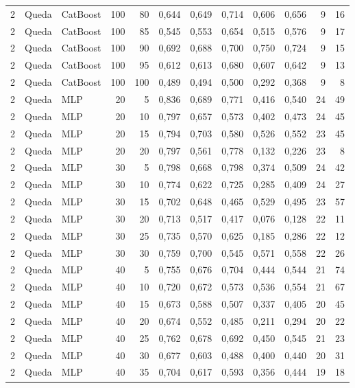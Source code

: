 \begin{longtable}{@{}rllrrrrrrrrr@{}}
2 & Queda & CatBoost & 100 & 80 & 0,644 & 0,649 & 0,714 & 0,606 & 0,656 & 9 & 16 \\
2 & Queda & CatBoost & 100 & 85 & 0,545 & 0,553 & 0,654 & 0,515 & 0,576 & 9 & 17 \\
2 & Queda & CatBoost & 100 & 90 & 0,692 & 0,688 & 0,700 & 0,750 & 0,724 & 9 & 15 \\
2 & Queda & CatBoost & 100 & 95 & 0,612 & 0,613 & 0,680 & 0,607 & 0,642 & 9 & 13 \\
2 & Queda & CatBoost & 100 & 100 & 0,489 & 0,494 & 0,500 & 0,292 & 0,368 & 9 & 8 \\
2 & Queda & MLP & 20 & 5 & 0,836 & 0,689 & 0,771 & 0,416 & 0,540 & 24 & 49 \\
2 & Queda & MLP & 20 & 10 & 0,797 & 0,657 & 0,573 & 0,402 & 0,473 & 24 & 45 \\
2 & Queda & MLP & 20 & 15 & 0,794 & 0,703 & 0,580 & 0,526 & 0,552 & 23 & 45 \\
2 & Queda & MLP & 20 & 20 & 0,797 & 0,561 & 0,778 & 0,132 & 0,226 & 23 & 8 \\
2 & Queda & MLP & 30 & 5 & 0,798 & 0,668 & 0,798 & 0,374 & 0,509 & 24 & 42 \\
2 & Queda & MLP & 30 & 10 & 0,774 & 0,622 & 0,725 & 0,285 & 0,409 & 24 & 27 \\
2 & Queda & MLP & 30 & 15 & 0,702 & 0,648 & 0,465 & 0,529 & 0,495 & 23 & 57 \\
2 & Queda & MLP & 30 & 20 & 0,713 & 0,517 & 0,417 & 0,076 & 0,128 & 22 & 11 \\
2 & Queda & MLP & 30 & 25 & 0,735 & 0,570 & 0,625 & 0,185 & 0,286 & 22 & 12 \\
2 & Queda & MLP & 30 & 30 & 0,759 & 0,700 & 0,545 & 0,571 & 0,558 & 22 & 26 \\
2 & Queda & MLP & 40 & 5 & 0,755 & 0,676 & 0,704 & 0,444 & 0,544 & 21 & 74 \\
2 & Queda & MLP & 40 & 10 & 0,720 & 0,672 & 0,573 & 0,536 & 0,554 & 21 & 67 \\
2 & Queda & MLP & 40 & 15 & 0,673 & 0,588 & 0,507 & 0,337 & 0,405 & 20 & 45 \\
2 & Queda & MLP & 40 & 20 & 0,674 & 0,552 & 0,485 & 0,211 & 0,294 & 20 & 22 \\
2 & Queda & MLP & 40 & 25 & 0,762 & 0,678 & 0,692 & 0,450 & 0,545 & 21 & 23 \\
2 & Queda & MLP & 40 & 30 & 0,677 & 0,603 & 0,488 & 0,400 & 0,440 & 20 & 31 \\
2 & Queda & MLP & 40 & 35 & 0,704 & 0,617 & 0,593 & 0,356 & 0,444 & 19 & 18 \\

\end{longtable}
